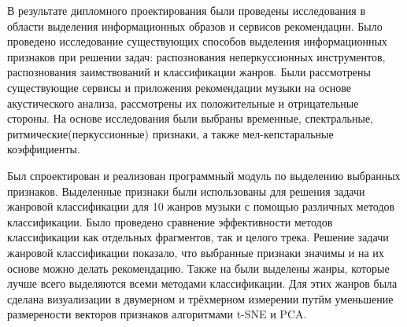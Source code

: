 \label{sec:outro}

В результате дипломного проектирования были проведены исследования в области выделения информационных образов и сервисов рекомендации. Было проведено исследование существующих способов выделения информационных признаков при решении задач: распознования неперкуссионных инструментов, распознования заимствований и классификации жанров. Были рассмотрены существующие сервисы и приложения рекомендации музыки на основе акустического анализа, рассмотрены их  положительные и отрицательные стороны. 
На основе исследования были выбраны временные, спектральные, ритмические(перкуссионные) признаки,  а также мел-кепстаральные коэффициенты. 

Был спроектирован и реализован программный модуль по выделению выбранных признаков. Выделенные признаки были использованы для решения задачи жанровой классификации для 10 жанров музыки с помощью различных методов классификации. Было проведено сравнение эффективности методов классификации как отдельных фрагментов, так и целого трека. Решение задачи  жанровой классификации показало, что выбранные признаки значимы и на их основе можно делать рекомендацию.  Также на были выделены жанры, которые лучше всего выделяются всеми методами классификации. Для этих жанров была сделана визуализации в двумерном и трёхмерном измерении путйм уменьшение размерености векторов признаков алгоритмами t-SNE и PCA.

 